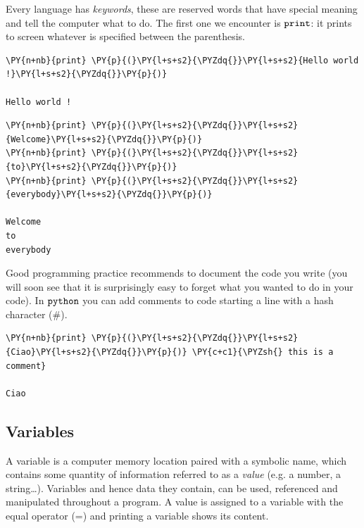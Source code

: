 Every language has \emph{keywords}, these are reserved words that have special meaning and tell the computer what to do. The first one we encounter is \(\tt{print}\): it prints to screen whatever is specified between the parenthesis.

\begin{codebox}
\begin{Verbatim}[commandchars=\\\{\}]
\PY{n+nb}{print} \PY{p}{(}\PY{l+s+s2}{\PYZdq{}}\PY{l+s+s2}{Hello world !}\PY{l+s+s2}{\PYZdq{}}\PY{p}{)} 

Hello world !
\end{Verbatim}
\end{codebox}

\begin{codebox}
\begin{Verbatim}[commandchars=\\\{\}]
\PY{n+nb}{print} \PY{p}{(}\PY{l+s+s2}{\PYZdq{}}\PY{l+s+s2}{Welcome}\PY{l+s+s2}{\PYZdq{}}\PY{p}{)}
\PY{n+nb}{print} \PY{p}{(}\PY{l+s+s2}{\PYZdq{}}\PY{l+s+s2}{to}\PY{l+s+s2}{\PYZdq{}}\PY{p}{)}
\PY{n+nb}{print} \PY{p}{(}\PY{l+s+s2}{\PYZdq{}}\PY{l+s+s2}{everybody}\PY{l+s+s2}{\PYZdq{}}\PY{p}{)}

Welcome
to
everybody
\end{Verbatim}
\end{codebox}

Good programming practice recommends to document the code you write (you will soon see that it is surprisingly easy to forget what you wanted to do in your code). In \(\tt{python}\) you can add comments to code starting a line with a hash character (\#).

\begin{codebox}
\begin{Verbatim}[commandchars=\\\{\}]
\PY{n+nb}{print} \PY{p}{(}\PY{l+s+s2}{\PYZdq{}}\PY{l+s+s2}{Ciao}\PY{l+s+s2}{\PYZdq{}}\PY{p}{)} \PY{c+c1}{\PYZsh{} this is a comment}

Ciao
\end{Verbatim}
\end{codebox}

\subsection{Variables}\label{variables}

A variable is a computer memory location paired with a symbolic name, which contains some quantity of information referred to as a \emph{value} (e.g. a number, a string\ldots). Variables and hence data they contain, can be used, referenced and manipulated throughout a program.
A value is assigned to a variable with the equal operator (=) and printing a variable shows its content. 

